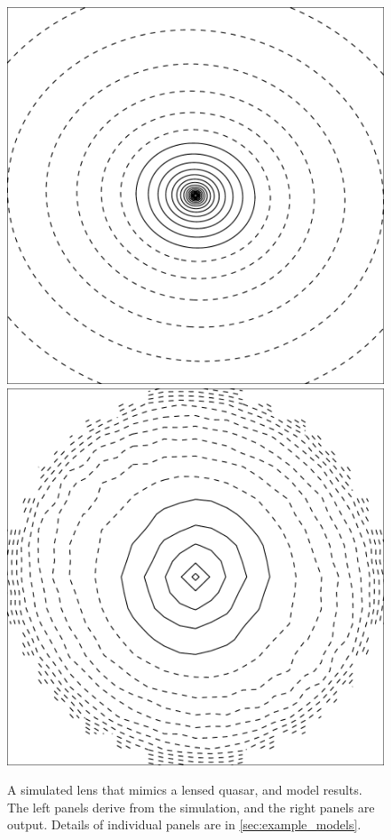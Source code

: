 \begin{figure}
  \includegraphics[width=\myplotswidth]{fig/ASW000102p_006941_kappa}
  \includegraphics[width=\myplotswidth]{fig/006941_mass}
  \caption[result 6941 (ASW000102p)]{A simulated lens that mimics a
    lensed quasar, and model results.  The left panels derive from the
    simulation, and the right panels are \spl output.  Details of
    individual panels are in \ref{sec:example_models}.}

  \label{fig:6941}
\end{figure}

